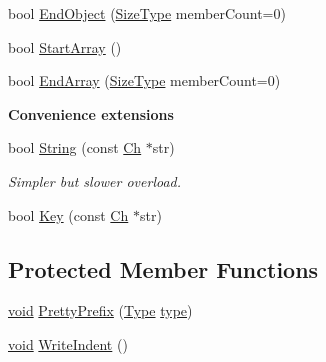 \begin{Indent}
\begin{DoxyCompactItemize}
\item 
bool \hyperlink{classPrettyWriter_a6bfdfa4193193ef763cce5c592c4d20c}{End\+Object} (\hyperlink{rapidjson_8h_a5ed6e6e67250fadbd041127e6386dcb5}{Size\+Type} member\+Count=0)
\item 
bool \hyperlink{classPrettyWriter_aec7fdf4798a3af5e31c147633f4798ed}{Start\+Array} ()
\item 
bool \hyperlink{classPrettyWriter_a1e9d97fc950d349f55abd864c787ff37}{End\+Array} (\hyperlink{rapidjson_8h_a5ed6e6e67250fadbd041127e6386dcb5}{Size\+Type} member\+Count=0)
\end{DoxyCompactItemize}
\end{Indent}
\begin{Indent}\textbf{ Convenience extensions}\par
\begin{DoxyCompactItemize}
\item 
bool \hyperlink{classPrettyWriter_a7e85689355a827d273f272c26b447225}{String} (const \hyperlink{classPrettyWriter_ae35c89bda4c5d59d3ff6efcf2fea45a3}{Ch} $\ast$str)
\begin{DoxyCompactList}\small\item\em Simpler but slower overload. \end{DoxyCompactList}\item 
bool \hyperlink{classPrettyWriter_a4b2a2a6eef02c12d7a3fd77966bd4499}{Key} (const \hyperlink{classPrettyWriter_ae35c89bda4c5d59d3ff6efcf2fea45a3}{Ch} $\ast$str)
\end{DoxyCompactItemize}
\end{Indent}
\subsection*{Protected Member Functions}
\begin{DoxyCompactItemize}
\item 
\hyperlink{imgui__impl__opengl3__loader_8h_ac668e7cffd9e2e9cfee428b9b2f34fa7}{void} \hyperlink{classPrettyWriter_a09709ffa3b545e007631ecfd35029843}{Pretty\+Prefix} (\hyperlink{rapidjson_8h_a1d1cfd8ffb84e947f82999c682b666a7}{Type} \hyperlink{imgui__impl__opengl3__loader_8h_a63267399cd2a2ee217572c11d2e54f07}{type})
\item 
\hyperlink{imgui__impl__opengl3__loader_8h_ac668e7cffd9e2e9cfee428b9b2f34fa7}{void} \hyperlink{classPrettyWriter_a6f244ecc94fd5b134d424033b1574b7e}{Write\+Indent} ()
\end{DoxyCompactItemize}
